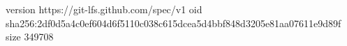 version https://git-lfs.github.com/spec/v1
oid sha256:2df0d5a4c0ef604d6f5110c038c615dcea5d4bbf848d3205e81aa07611e9d89f
size 349708
